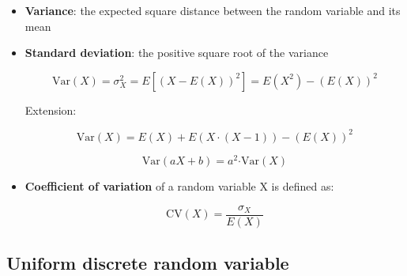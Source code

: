 \documentclass[12pt]{report}
\renewcommand{\_}{\kern-1.5pt\textunderscore\kern-1.5pt}
\begin{document}
\begin{itemize}
\begin{itemize}
	\item \textbf{Variance}: the expected square distance between the random variable and its mean\par

	\item \textbf{Standard deviation}: the positive square root of the variance\par

 \[ \mathrm{Var} \left( X \right) = \sigma _{X}^{2}=E \left[  \left( X-E \left( X \right)  \right) ^{2} \right] =E \left( X^{2} \right) - \left( E \left( X \right)  \right) ^{2} \] \par

Extension:\par

 \[ \mathrm{Var} \left( X \right) =E \left( X \right) +E \left( X \cdot  \left( X-1 \right)  \right) - \left( E \left( X \right)  \right) ^{2} \] \par

 \[ \mathrm{Var} \left( aX+b \right) =a^{2}\mathrm{  \cdot  Var} \left( X \right)  \] \par

	\item \textbf{Coefficient of variation }of a random variable X is defined as:\par

 \[ \mathrm{CV} \left( X \right) =\frac{ \sigma _{X}}{E \left( X \right) } \] \par


\end{itemize}
\end{itemize}\subsection*{Uniform discrete random variable}
\end{document}
